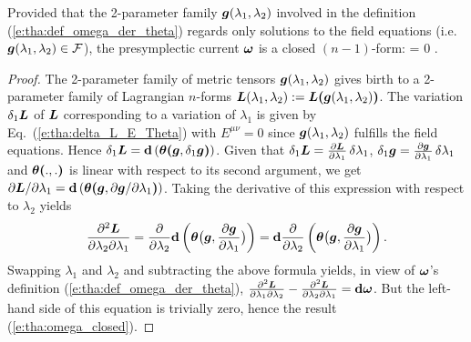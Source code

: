 \begin{prop}
\label{p:tha:omega_closed}
Provided that the 2-parameter family $\bm{g}(\lambda_1,\lambda_2)$
involved in the definition (\ref{e:tha:def_omega_der_theta}) regards
only solutions to the field equations (i.e. $\bm{g}(\lambda_1,\lambda_2) \in \mathcal{F}$),
the presymplectic current $\bm{\omega}$ is a closed $(n-1)$-form:
\be \label{e:tha:omega_closed}
    \dd \w{\omega} = 0 .
\ee
\end{prop}
\begin{proof}
The 2-parameter family of metric tensors $\bm{g}(\lambda_1,\lambda_2)$ gives birth
to a 2-parameter family of Lagrangian $n$-forms
$\bm{L}(\lambda_1,\lambda_2) := \bm{L}\textbf{(}\bm{g}(\lambda_1,\lambda_2)\textbf{)}$.
The variation $\delta_1\bm{L}$ of $\bm{L}$ corresponding to a variation of $\lambda_1$ is
given by Eq.~(\ref{e:tha:delta_L_E_Theta}) with $E^{\mu\nu} = 0$ since
$\bm{g}(\lambda_1,\lambda_2)$ fulfills the field equations. Hence
$\delta_1 \bm{L} = \mathbf{d} \left( \bm{\theta}\textbf{(}\bm{g}, \delta_1 \bm{g}\textbf{)} \right)$.
Given that $\delta_1 \bm{L} = \frac{\partial \bm{L}}{\partial \lambda_1}  \, \delta \lambda_1$,
$\delta_1 \bm{g} = \frac{\partial \bm{g}}{\partial \lambda_1} \, \delta \lambda_1$
and $\bm{\theta}\textbf{(} .,.\textbf{)}$ is linear with respect to its second argument, we get
${\partial \bm{L}}/{\partial \lambda_1} = \mathbf{d} \left( \bm{\theta} \textbf{(}\bm{g},  {\partial \bm{g}}/{\partial \lambda_1} \textbf{)} \right)$.
Taking the derivative of this expression with respect to $\lambda_2$ yields
\[
    \frac{\partial^2\bm{L}}{\partial\lambda_2\partial\lambda_1} = \frac{\partial }{\partial \lambda_2}
        \mathbf{d} \left( \bm{\theta} \bm{\big(}\bm{g},  \frac{\partial \bm{g}}{\partial \lambda_1} \bm{\big)} \right)
        = \mathbf{d}  \frac{\partial }{\partial \lambda_2} \left( \bm{\theta} \bm{\big(}\bm{g},  \frac{\partial \bm{g}}{\partial \lambda_1} \bm{\big)} \right) .
\]
Swapping $\lambda_1$ and $\lambda_2$ and subtracting the above formula
yields, in view of $\bm{\omega}$'s definition (\ref{e:tha:def_omega_der_theta}),
$\frac{\partial^2\bm{L}}{\partial\lambda_1\partial\lambda_2} - \frac{\partial^2\bm{L}}{\partial\lambda_2\partial\lambda_1} = \mathbf{d}\bm{\omega}$. But the left-hand side of this equation
is trivially zero, hence the result (\ref{e:tha:omega_closed}).
\end{proof}

